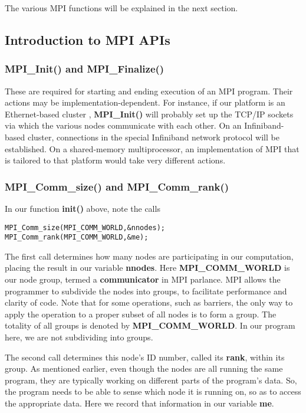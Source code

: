 The various MPI functions will be explained in the next section.

\subsection{Introduction to MPI APIs}

\subsubsection{MPI\_Init() and MPI\_Finalize()}

These are required for starting and ending execution of an MPI program.
Their actions may be implementation-dependent.  For instance, if our
platform is an Ethernet-based cluster , {\bf MPI\_Init()} will probably
set up the TCP/IP sockets via which the various nodes communicate with
each other.  On an Infiniband-based cluster, connections in the special
Infiniband network protocol will be established.  On a shared-memory
multiprocessor, an implementation of MPI that is tailored to that
platform would take very different actions.

\subsubsection{MPI\_Comm\_size() and MPI\_Comm\_rank()}

In our function {\bf init()} above, note the calls

\begin{Verbatim}[fontsize=\relsize{-2}]
MPI_Comm_size(MPI_COMM_WORLD,&nnodes);
MPI_Comm_rank(MPI_COMM_WORLD,&me);
\end{Verbatim}

The first call determines how many nodes are participating in our
computation, placing the result in our variable {\bf nnodes}.  Here {\bf
MPI\_COMM\_WORLD} is our node group, termed a {\bf communicator} in MPI
parlance.  MPI allows the programmer to subdivide the nodes into groups,
to facilitate performance and clarity of code.  Note that for some
operations, such as barriers, the only way to apply the operation to a
proper subset of all nodes is to form a group.  The totality of all
groups is denoted by {\bf MPI\_COMM\_WORLD}.  In our program here, we
are not subdividing into groups.

The second call determines this node's ID number, called its {\bf rank},
within its group.  As mentioned earlier, even though the nodes are all
running the same program, they are typically working on different parts
of the program's data.  So, the program needs to be able to sense which
node it is running on, so as to access the appropriate data.  Here we
record that information in our variable {\bf me}.

